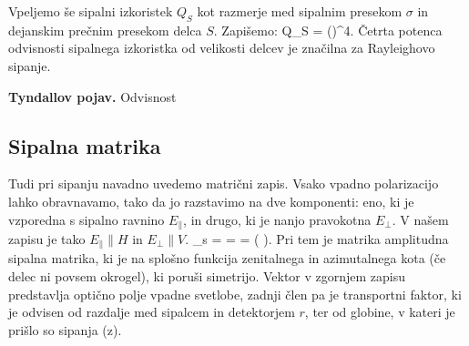 Vpeljemo še sipalni izkoristek $Q_S$ kot razmerje med sipalnim presekom $\sigma$ in 
dejanskim prečnim presekom delca $S$. Zapišemo:
\beq
Q_S =  \propto {}\propto\left(\right)^4\!\!.
\label{eq:07_17}
\eeq
Četrta potenca odvisnosti sipalnega izkoristka od velikosti delcev je značilna za Rayleighovo sipanje.


\begin{example}{\bf Tyndallov pojav.}
Odvisnost  
 
\end{example}

\subsection*{Sipalna matrika}
Tudi pri sipanju navadno uvedemo matrični zapis. Vsako vpadno polarizacijo lahko obravnavamo, tako
da jo razstavimo na dve komponenti: eno, ki je vzporedna s sipalno ravnino $E_\parallel$, in drugo, ki 
je nanjo pravokotna $E_\perp$. V našem zapisu je tako $E_\parallel \parallel H$ in
$E_\perp \parallel V$. 
\beq
{}_s = 
\left[\begin{array}{c}
E_{s,H}\\
E_{s,V}\\
\end{array}\right]
=  = 
\left[\begin{array}{cc}
S_2 & S_3 \\
S_4 & S_1\\
\end{array}\right] 
\left(
\right)\!\!.
\label{eq:07_14}
\eeq
Pri tem je matrika amplitudna sipalna matrika, ki je na splošno funkcija zenitalnega
in azimutalnega kota (če delec ni povsem okrogel), ki poruši simetrijo. Vektor v zgornjem
zapisu predstavlja optično polje vpadne svetlobe, zadnji člen pa je transportni faktor,
ki je odvisen od razdalje med sipalcem in detektorjem $r$, ter od globine, v kateri
je prišlo so sipanja (z).


